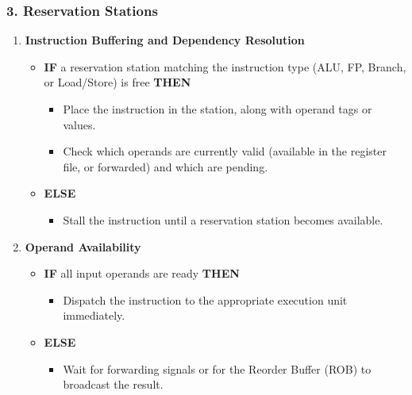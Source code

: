 {  \subsubsection*{3. Reservation Stations}
  \vspace{-5px}
  \begin{enumerate}
      \item \textbf{Instruction Buffering and Dependency Resolution}
      \begin{itemize}
          \item \textbf{IF} a reservation station matching the instruction type (ALU, FP, Branch, or Load/Store) is free \textbf{THEN}
          \begin{itemize}
              \item Place the instruction in the station, along with operand tags or values.
              \item Check which operands are currently valid (available in the register file, or forwarded) and which are pending.
          \end{itemize}
          \item \textbf{ELSE}
          \begin{itemize}
              \item Stall the instruction until a reservation station becomes available.
          \end{itemize}
      \end{itemize}
      \item \textbf{Operand Availability}
      \begin{itemize}
          \item \textbf{IF} all input operands are ready \textbf{THEN}
          \begin{itemize}
              \item Dispatch the instruction to the appropriate execution unit immediately.
          \end{itemize}
          \item \textbf{ELSE}
          \begin{itemize}
              \item Wait for forwarding signals or for the Reorder Buffer (ROB) to broadcast the result.
          \end{itemize}
      \end{itemize}
  \end{enumerate}
  \newpage
}
